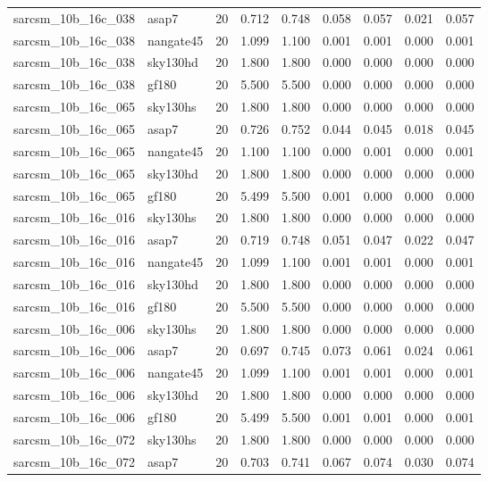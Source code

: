 \begin{tabular}{llrrrrrrr}
sarcsm\_10b\_16c\_038 & asap7 & 20 & 0.712 & 0.748 & 0.058 & 0.057 & 0.021 & 0.057 \\
sarcsm\_10b\_16c\_038 & nangate45 & 20 & 1.099 & 1.100 & 0.001 & 0.001 & 0.000 & 0.001 \\
sarcsm\_10b\_16c\_038 & sky130hd & 20 & 1.800 & 1.800 & 0.000 & 0.000 & 0.000 & 0.000 \\
sarcsm\_10b\_16c\_038 & gf180 & 20 & 5.500 & 5.500 & 0.000 & 0.000 & 0.000 & 0.000 \\
sarcsm\_10b\_16c\_065 & sky130hs & 20 & 1.800 & 1.800 & 0.000 & 0.000 & 0.000 & 0.000 \\
sarcsm\_10b\_16c\_065 & asap7 & 20 & 0.726 & 0.752 & 0.044 & 0.045 & 0.018 & 0.045 \\
sarcsm\_10b\_16c\_065 & nangate45 & 20 & 1.100 & 1.100 & 0.000 & 0.001 & 0.000 & 0.001 \\
sarcsm\_10b\_16c\_065 & sky130hd & 20 & 1.800 & 1.800 & 0.000 & 0.000 & 0.000 & 0.000 \\
sarcsm\_10b\_16c\_065 & gf180 & 20 & 5.499 & 5.500 & 0.001 & 0.000 & 0.000 & 0.000 \\
sarcsm\_10b\_16c\_016 & sky130hs & 20 & 1.800 & 1.800 & 0.000 & 0.000 & 0.000 & 0.000 \\
sarcsm\_10b\_16c\_016 & asap7 & 20 & 0.719 & 0.748 & 0.051 & 0.047 & 0.022 & 0.047 \\
sarcsm\_10b\_16c\_016 & nangate45 & 20 & 1.099 & 1.100 & 0.001 & 0.001 & 0.000 & 0.001 \\
sarcsm\_10b\_16c\_016 & sky130hd & 20 & 1.800 & 1.800 & 0.000 & 0.000 & 0.000 & 0.000 \\
sarcsm\_10b\_16c\_016 & gf180 & 20 & 5.500 & 5.500 & 0.000 & 0.000 & 0.000 & 0.000 \\
sarcsm\_10b\_16c\_006 & sky130hs & 20 & 1.800 & 1.800 & 0.000 & 0.000 & 0.000 & 0.000 \\
sarcsm\_10b\_16c\_006 & asap7 & 20 & 0.697 & 0.745 & 0.073 & 0.061 & 0.024 & 0.061 \\
sarcsm\_10b\_16c\_006 & nangate45 & 20 & 1.099 & 1.100 & 0.001 & 0.001 & 0.000 & 0.001 \\
sarcsm\_10b\_16c\_006 & sky130hd & 20 & 1.800 & 1.800 & 0.000 & 0.000 & 0.000 & 0.000 \\
sarcsm\_10b\_16c\_006 & gf180 & 20 & 5.499 & 5.500 & 0.001 & 0.001 & 0.000 & 0.001 \\
sarcsm\_10b\_16c\_072 & sky130hs & 20 & 1.800 & 1.800 & 0.000 & 0.000 & 0.000 & 0.000 \\
sarcsm\_10b\_16c\_072 & asap7 & 20 & 0.703 & 0.741 & 0.067 & 0.074 & 0.030 & 0.074 \\

\end{tabular}
